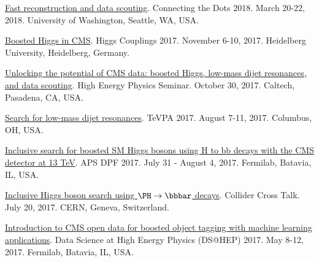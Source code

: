 \documentclass{res}
\begin{document}
\begin{resume}
  \href{https://indico.cern.ch/event/658267/contributions/2881127/}{Fast reconstruction and data scouting}. Connecting the Dots 2018. March 20-22, 2018. University of Washington, Seattle, WA, USA.

  \href{http://www.thphys.uni-heidelberg.de/~higgs/talks/duarte.pdf}{Boosted Higgs in CMS}. Higgs Couplings 2017. November 6-10, 2017. Heidelberg University, Heidelberg, Germany.

  \href{https://indico.hep.caltech.edu/indico/conferenceDisplay.py?confId=149}{Unlocking the potential of CMS data: boosted Higgs, low-mass dijet resonances, and data scouting}. High Energy Physics Seminar. October 30, 2017. Caltech, Pasadena, CA, USA.

  \href{https://indico.cern.ch/event/615891/contributions/2666361/}{Search for low-mass dijet resonances}. TeVPA 2017. August 7-11, 2017. Columbus, OH, USA.

  \href{https://indico.fnal.gov/contributionDisplay.py?sessionId=14&contribId=38&confId=11999}{Inclusive search for boosted SM Higgs bosons using H to bb decays with the CMS detector at 13 TeV}. APS DPF 2017. July 31 - August 4, 2017. Fermilab, Batavia, IL, USA.

  \href{https://indico.cern.ch/event/649575/}{Inclusive Higgs boson search using $\PH\to\bbbar$ decays}. Collider Cross Talk. July 20, 2017. CERN, Geneva, Switzerland.

  \href{https://indico.fnal.gov/contributionDisplay.py?sessionId=6&contribId=54&confId=13497}{Introduction to CMS open data for boosted object tagging with machine learning applications}. Data Science at High Energy Physics (DS@HEP) 2017. May 8-12, 2017. Fermilab, Batavia, IL, USA.

\end{resume}
\end{document}
